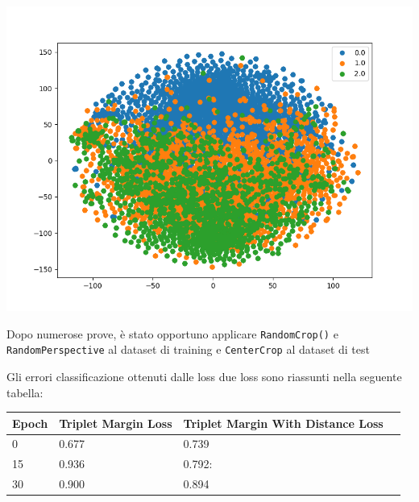 \documentclass[11pt]{article}
\begin{document}
\begin{center}
\begin{minipage}{0.3\linewidth}
    \includegraphics[width=\linewidth]{09.png}
    \end{minipage}
\end{center}

Dopo numerose prove, è stato opportuno applicare \texttt{RandomCrop()} e \texttt{RandomPerspective} al dataset di training e \texttt{CenterCrop} al dataset di test

\pagebreak

Gli errori classificazione ottenuti dalle loss due loss sono riassunti nella seguente tabella:

\begin{center}
    \begin{tabular}{ | l | l | l | p{5cm} |}
    \hline
    Epoch & Triplet Margin Loss & Triplet Margin With Distance Loss \\ \hline
    0 & 0.677 & 0.739 \\ \hline
    15 & 0.936 & 0.792: \\ \hline
    30 & 0.900 & 0.894  \\
    \hline
    \end{tabular}
\end{center}
\end{document}
